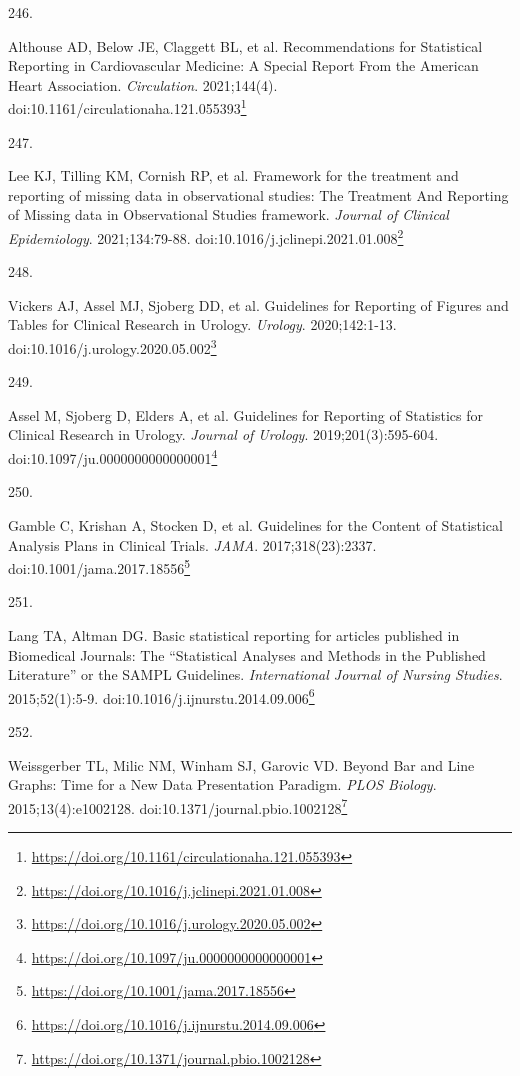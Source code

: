 \documentclass[
  a4paper,
]{book}
\newlength{\cslhangindent}
\newlength{\csllabelwidth}
\newlength{\cslentryspacingunit} %
\newenvironment{CSLReferences}[2] %
 {%
  \setlength{\parindent}{0pt}
  \ifodd #1
  \let\oldpar\par
  \def\par{\hangindent=\cslhangindent\oldpar}
  \fi
  \setlength{\parskip}{#2\cslentryspacingunit}
 }%
 {}
\newcommand{\CSLLeftMargin}[1]{\parbox[t]{\csllabelwidth}{#1}}
\newcommand{\CSLRightInline}[1]{\parbox[t]{\linewidth - \csllabelwidth}{#1}\break}
\renewcommand{\href}[2]{#2\footnote{\url{#1}}}
\begin{document}
\begin{CSLReferences}{0}{0}
\leavevmode{}%
\CSLLeftMargin{246. }%
\CSLRightInline{Althouse AD, Below JE, Claggett BL, et al. Recommendations for Statistical Reporting in Cardiovascular Medicine: A Special Report From the American Heart Association. \emph{Circulation}. 2021;144(4). doi:\href{https://doi.org/10.1161/circulationaha.121.055393}{10.1161/circulationaha.121.055393}}

\leavevmode{}%
\CSLLeftMargin{247. }%
\CSLRightInline{Lee KJ, Tilling KM, Cornish RP, et al. Framework for the treatment and reporting of missing data in observational studies: The Treatment And Reporting of Missing data in Observational Studies framework. \emph{Journal of Clinical Epidemiology}. 2021;134:79-88. doi:\href{https://doi.org/10.1016/j.jclinepi.2021.01.008}{10.1016/j.jclinepi.2021.01.008}}

\leavevmode{}%
\CSLLeftMargin{248. }%
\CSLRightInline{Vickers AJ, Assel MJ, Sjoberg DD, et al. Guidelines for Reporting of Figures and Tables for Clinical Research in Urology. \emph{Urology}. 2020;142:1-13. doi:\href{https://doi.org/10.1016/j.urology.2020.05.002}{10.1016/j.urology.2020.05.002}}

\leavevmode{}%
\CSLLeftMargin{249. }%
\CSLRightInline{Assel M, Sjoberg D, Elders A, et al. Guidelines for Reporting of Statistics for Clinical Research in Urology. \emph{Journal of Urology}. 2019;201(3):595-604. doi:\href{https://doi.org/10.1097/ju.0000000000000001}{10.1097/ju.0000000000000001}}

\leavevmode{}%
\CSLLeftMargin{250. }%
\CSLRightInline{Gamble C, Krishan A, Stocken D, et al. Guidelines for the Content of Statistical Analysis Plans in Clinical Trials. \emph{JAMA}. 2017;318(23):2337. doi:\href{https://doi.org/10.1001/jama.2017.18556}{10.1001/jama.2017.18556}}

\leavevmode{}%
\CSLLeftMargin{251. }%
\CSLRightInline{Lang TA, Altman DG. Basic statistical reporting for articles published in Biomedical Journals: The {``}Statistical Analyses and Methods in the Published Literature{''} or the SAMPL Guidelines. \emph{International Journal of Nursing Studies}. 2015;52(1):5-9. doi:\href{https://doi.org/10.1016/j.ijnurstu.2014.09.006}{10.1016/j.ijnurstu.2014.09.006}}

\leavevmode{}%
\CSLLeftMargin{252. }%
\CSLRightInline{Weissgerber TL, Milic NM, Winham SJ, Garovic VD. Beyond Bar and Line Graphs: Time for a New Data Presentation Paradigm. \emph{PLOS Biology}. 2015;13(4):e1002128. doi:\href{https://doi.org/10.1371/journal.pbio.1002128}{10.1371/journal.pbio.1002128}}


\end{CSLReferences}
\end{document}
